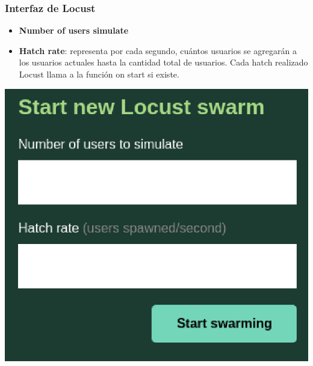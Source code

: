 \documentclass{beamer}
\theoremstyle{plain}
\theoremstyle{definition}
\theoremstyle{plain}
\theoremstyle{definition}
\theoremstyle{remark}
\theoremstyle{definition}
\begin{document}
\begin{frame}
\frametitle{Interfaz de Locust}
\begin{itemize}			
	\item \textbf{Number of users simulate}
	\item \textbf{Hatch rate}: representa por cada segundo, cuántos usuarios se agregarán a los usuarios actuales hasta la cantidad total de usuarios. Cada hatch realizado Locust llama a la función on start si existe.
\end{itemize}
	
	\centering
	\includegraphics[scale=0.1]{imagenes/locustInterfaz.png}
\end{frame}
\end{document}
